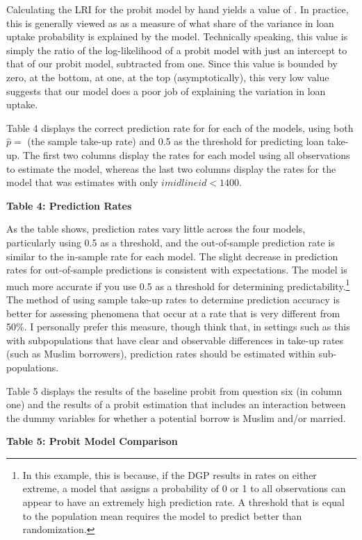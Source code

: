 \documentclass{article}
\begin{document}
Calculating the LRI for the probit model by hand yields a value of . In practice, this is generally viewed as as a measure of what share of the variance in loan uptake probability is explained by the model. Technically speaking, this value is simply the ratio of the log-likelihood of a probit model with just an intercept to that of our probit model, subtracted from one. Since this value is bounded by zero, at the bottom, at one, at the top (asymptotically), this very low value suggests that our model does a poor job of explaining the variation in loan uptake.

Table 4 displays the correct prediction rate for for each of the models, using both $\hat{p}=$ (the sample take-up rate) and 0.5 as the threshold for predicting loan take-up. The first two columns display the rates for each model using all observations to estimate the model, whereas the last two columns display the rates for the model that was estimates with only $imidlineid<1400$.
\begin{center}
        \textbf{Table 4: Prediction Rates} \\\medskip
        
\end{center}
As the table shows, prediction rates vary little across the four models, particularly using 0.5 as a threshold, and the out-of-sample prediction rate is similar to the in-sample rate for each model. The slight decrease in prediction rates for out-of-sample predictions is consistent with expectations. The model is much more accurate if you use 0.5 as a threshold for determining predictability.\footnote{In this example, this is because, if the DGP results in rates on either extreme, a model that assigns a probability of 0 or 1 to all observations can appear to have an extremely high prediction rate. A threshold that is equal to the population mean requires the model to predict better than randomization.} The method of using sample take-up rates to determine prediction accuracy is better for assessing phenomena that occur at a rate that is very different from 50\%. I personally prefer this measure, though think that, in settings such as this with subpopulations that have clear and observable differences in take-up rates (such as Muslim borrowers), prediction rates should be estimated within sub-populations.

Table 5 displays the results of the baseline probit from question six (in column one) and the results of a probit estimation that includes an interaction between the dummy variables for whether a potential borrow is Muslim and/or married.
\begin{center}
        \textbf{Table 5: Probit Model Comparison} \\\medskip
{\footnotesize
        
}
\end{center}
\end{document}
